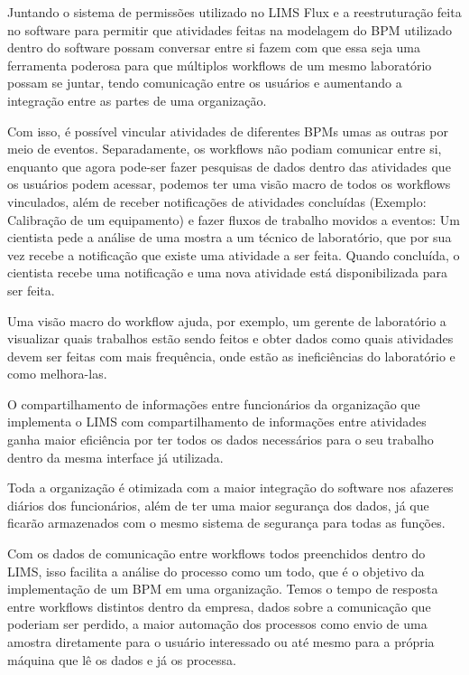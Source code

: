 
Juntando o sistema de permissões utilizado no LIMS Flux \R e a reestruturação feita no software para permitir que atividades feitas na modelagem do BPM utilizado dentro do software possam conversar entre si fazem com que essa seja uma ferramenta poderosa para que múltiplos workflows de um mesmo laboratório possam se juntar, tendo comunicação entre os usuários e aumentando a integração entre as partes de uma organização.


Com isso, é possível vincular atividades de diferentes BPMs umas as outras por meio de eventos. Separadamente, os workflows não podiam comunicar entre si, enquanto que agora pode-ser fazer pesquisas de dados dentro das atividades que os usuários podem acessar, podemos ter uma visão macro de todos os workflows vinculados, além de receber notificações de atividades concluídas (Exemplo: Calibração de um equipamento) e fazer fluxos de trabalho movidos a eventos: Um cientista pede a análise de uma mostra a um técnico de laboratório, que por sua vez recebe a notificação que existe uma atividade a ser feita. Quando concluída, o cientista recebe uma notificação e uma nova atividade está disponibilizada para ser feita.


Uma visão macro do workflow ajuda, por exemplo, um gerente de laboratório a visualizar quais trabalhos estão sendo feitos e obter dados como quais atividades devem ser feitas com mais frequência, onde estão as ineficiências do laboratório e como melhora-las.

O compartilhamento de informações entre funcionários da organização que implementa o LIMS com compartilhamento de informações entre atividades ganha maior eficiência por ter todos os dados necessários para o seu trabalho dentro da mesma interface já utilizada.

Toda a organização é otimizada com a maior integração do software nos afazeres diários dos funcionários, além de ter uma maior segurança dos dados, já que ficarão armazenados com o mesmo sistema de segurança para todas as funções.


Com os dados de comunicação entre workflows todos preenchidos dentro do LIMS, isso facilita a análise do processo como um todo, que é o objetivo da implementação de um BPM em uma organização. Temos o tempo de resposta entre workflows distintos dentro da empresa, dados sobre a comunicação que poderiam ser perdido, a maior automação dos processos como envio de uma amostra diretamente para o usuário interessado ou até mesmo para a própria máquina que lê os dados e já os processa.